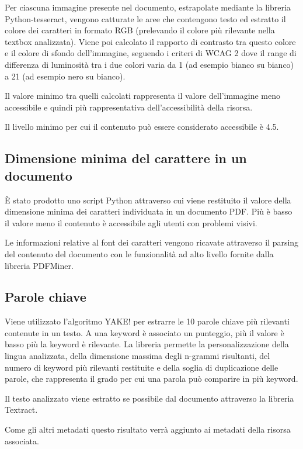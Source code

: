 Per ciascuna immagine presente nel documento, estrapolate mediante la libreria Python-tesseract, vengono catturate le aree che contengono testo ed estratto il colore dei caratteri in formato RGB (prelevando il colore più rilevante nella textbox analizzata). Viene poi calcolato il rapporto di contrasto tra questo colore e il colore di sfondo dell'immagine, seguendo i criteri di WCAG 2 dove il range di differenza di luminosità tra i due colori varia da 1 (ad esempio bianco su bianco) a 21 (ad esempio nero su bianco). 

Il valore minimo tra quelli calcolati rappresenta il valore dell'immagine meno accessibile e quindi più rappresentativa dell'accessibilità della risorsa.

Il livello minimo per cui il contenuto può essere considerato accessibile è 4.5.

\subsection{Dimensione minima del carattere in un documento}
È stato prodotto uno script Python attraverso cui viene restituito il valore della dimensione minima dei caratteri individuata in un documento PDF. Più è basso il valore meno il contenuto è accessibile agli utenti con problemi visivi.

Le informazioni relative al font dei caratteri vengono ricavate attraverso il parsing del contenuto del documento con le funzionalità ad alto livello fornite dalla libreria PDFMiner.

\subsection{Parole chiave}
Viene utilizzato l'algoritmo YAKE! per estrarre le 10 parole chiave più rilevanti contenute in un testo. A una keyword è associato un punteggio, più il valore è basso più la keyword è rilevante. La libreria permette la personalizzazione della lingua analizzata, della dimensione massima degli n-grammi risultanti, del numero di keyword più rilevanti restituite e della soglia di duplicazione delle parole, che rappresenta il grado per cui una parola può comparire in più keyword.

Il testo analizzato viene estratto se possibile dal documento attraverso la libreria Textract.

Come gli altri metadati questo risultato verrà aggiunto ai metadati della risorsa associata.